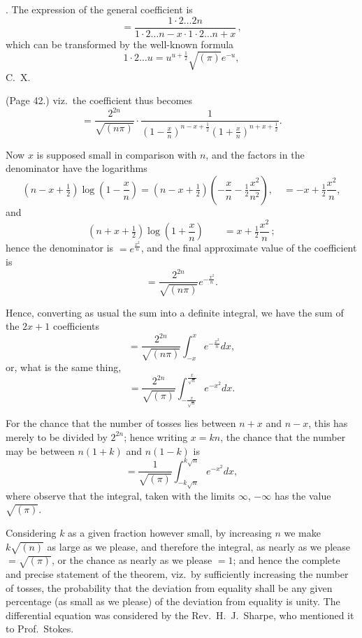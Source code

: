 \documentclass[11pt,a4paper]{article}
\begin{document}
\medskip

. The expression of the general coefficient is
\[
=\frac{1 \cdot 2 \ldots 2n}{1 \cdot 2 \ldots n - x \cdot 1 \cdot 2 \ldots n + x}\,,
\]
which can be transformed by the well-known formula
\[
1 \cdot 2 \ldots u = u^{u + \frac{1}{2}} \sqrt{(\pi)} e^{-u},
\]
\hfill C.\ X. 

\bigskip

\noindent (Page 42.) viz.\ the coefficient thus becomes
\[
= \frac{2^{2n}}{\sqrt{(n \pi)}} \cdot \frac{1}{\left( 1 - \frac{x}{n} \right)^{n - x + \frac{1}{2}} \left( 1 + \frac{x}{n} \right)^{n + x + \frac{1}{2}}}.
\]

Now $x$ is supposed small in comparison with $n$, and the factors in the denominator have the logarithms
\[
(n - x + \tfrac{1}{2}) \log \left( 1 - \frac{x}{n} \right) = (n - x + \tfrac{1}{2}) \left( -\frac{x}{n} - \tfrac{1}{2} \frac{x^2}{n^2} \right), \quad = -x + \tfrac{1}{2} \frac{x^2}{n},
\]
and
\[
(n + x + \tfrac{1}{2}) \log \left( 1 + \frac{x}{n} \right) \qquad = x + \tfrac{1}{2} \frac{x^2}{n}\,;
\]
hence the denominator is $= e^{\frac{x^2}{n}}$, and the final approximate value of the coefficient is
\[
= \frac{2^{2n}}{\sqrt{(n \pi)}} e^{-\frac{x^2}{n}}.
\]

Hence, converting as usual the sum into a definite integral, we have the sum of the $2x + 1$ coefficients
\[
= \frac{2^{2n}}{\sqrt{(n \pi)}} \int_{-x}^{x} e^{-\frac{x^2}{n}} dx,
\]
or, what is the same thing,
\[
= \frac{2^{2n}}{\sqrt{(\pi)}} \int_{-\frac{x}{\sqrt{n}}}^{\frac{x}{\sqrt{n}}} e^{-x^2} dx.
\]

For the chance that the number of tosses lies between $n + x$ and $n - x$, this has merely to be divided by $2^{2n}$; hence writing $x = kn$, the chance that the number may be between $n (1 + k)$ and $n (1 - k)$ is
\[
= \frac{1}{\sqrt{(\pi)}} \int_{-k\sqrt{n}}^{k\sqrt{n}} e^{-x^2} dx,
\]
where observe that the integral, taken with the limits $\infty$, $-\infty$ has the value $\sqrt{(\pi)}$.

Considering $k$ as a given fraction however small, by increasing $n$ we make $k\sqrt{(n)}$ as large as we please, and therefore the integral, as nearly as we please $= \sqrt{(\pi)}$, or the chance as nearly as we please $= 1$; and hence the complete and precise statement of the theorem, viz.\ by sufficiently increasing the number of tosses, the probability that the deviation from equality shall be any given percentage (as small as we please) of the deviation from equality is unity. The differential equation was considered by the Rev.\ H.\ J.\ Sharpe, who mentioned it to Prof.\ Stokes.
\end{document}
